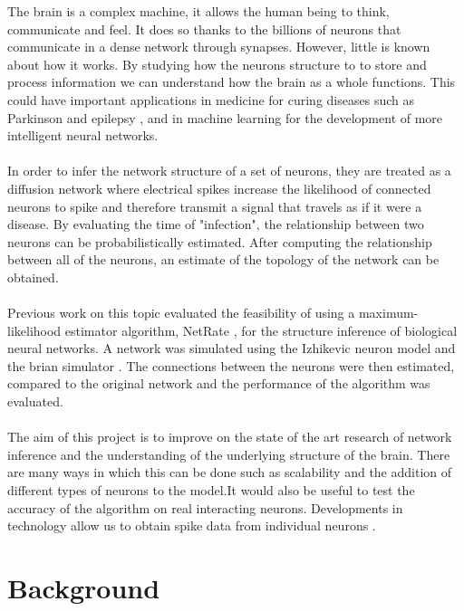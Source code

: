 \documentclass[10pt]{article}
\begin{document}
The brain is a complex machine, it allows the human being to think, communicate and feel. It does so thanks to the billions of neurons that communicate in a dense network through synapses. However, little is known about how it works. By studying how the neurons structure to to store and process information we can understand how the brain as a whole functions. This could have important applications in medicine for curing diseases such as Parkinson \cite{OldeDubbelinkKimT.E.2014Dbnt} and epilepsy \cite{PONTEN2007918}, and in machine learning for the development of more intelligent neural networks.
\\\\
In order to infer the network structure of a set of neurons, they are treated as a diffusion network where electrical spikes increase the likelihood of connected neurons to spike and therefore transmit a signal that travels as if it were a disease. By evaluating the time of "infection", the relationship between two neurons can be probabilistically estimated. After computing the relationship between all of the neurons, an estimate of the topology of the network can be obtained. 
\\\\
Previous work on this topic \cite{pranav_report, alexandru2018estimating} evaluated the feasibility of using a maximum-likelihood estimator algorithm, NetRate \cite{rodriguez2011uncovering}, for the structure inference of biological neural networks. A network was simulated using the Izhikevic neuron model \cite{izhikevich2003simple} and the brian simulator \cite{10.3389/neuro.01.026.2009}. The connections between the neurons were then estimated, compared to the original network and the performance of the algorithm was evaluated.
\\
\\
The aim of this project is to improve on the state of the art research of network inference and the understanding of the underlying structure of the brain. There are many ways in which this can be done such as scalability and the addition of different types of neurons to the model.It would also be useful to test the accuracy of the algorithm on real interacting neurons. Developments in technology allow us to obtain spike data from individual neurons \cite{ito2016spontaneous, ito2014large, litke2004does}.


\section{Background}
\end{document}
